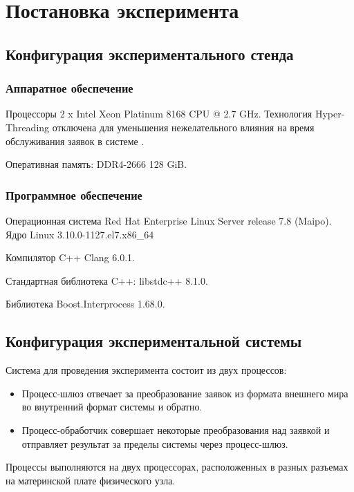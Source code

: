 \section{Постановка эксперимента}

\subsection{Конфигурация экспериментального стенда}

\subsubsection{Аппаратное обеспечение}

Процессоры 2 x Intel Xeon Platinum 8168 CPU @ 2.7 GHz.
Технология Hyper-Threading отключена для уменьшения нежелательного влияния на время обслуживания заявок в системе \cite{LowLatencyHT}.

Оперативная память: DDR4-2666 128 GiB.

\subsubsection{Программное обеспечение}

Операционная система Red Hat Enterprise Linux Server release 7.8 (Maipo).
Ядро Linux 3.10.0-1127.el7.x86\_64

Компилятор C++ Clang 6.0.1.

Стандартная библиотека C++: libstdc++ 8.1.0.

Библиотека Boost.Interprocess 1.68.0.

\subsection{Конфигурация экспериментальной системы}

Система для проведения эксперимента состоит из двух процессов:
\begin{itemize}
\item Процесс-шлюз отвечает за преобразование заявок из формата внешнего мира во внутренний формат системы и обратно. 
\item Процесс-обработчик совершает некоторые преобразования над заявкой и отправляет результат за пределы системы через процесс-шлюз.
\end{itemize}

Процессы выполняются на двух процессорах, расположенных в разных разъемах на материнской плате физического узла.


